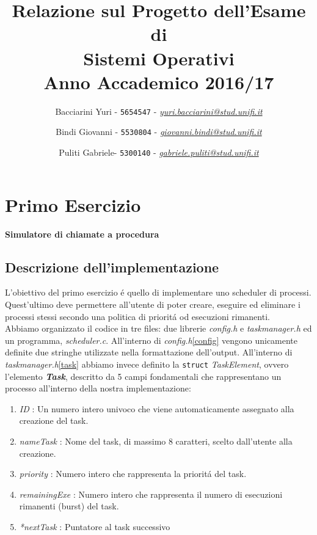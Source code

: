 \documentclass[a4paper]{article}
\begin{document}
 

\title{\vspace{2cm}Relazione sul Progetto dell'Esame di\\ \textbf{Sistemi Operativi}\\ Anno Accademico 2016/17}

\author{Bacciarini Yuri - \texttt{5654547} - \href{mailto:yuri.bacciarini@stud.unifi.it}{\textit{yuri.bacciarini@stud.unifi.it}}
   \and Bindi Giovanni - \texttt{5530804} - \href{mailto:giovanni.bindi@stud.unifi.it}{\textit{giovanni.bindi@stud.unifi.it}}
   \and Puliti Gabriele- \texttt{5300140} - \href{mailto:gabriele.puliti@stud.unifi.it}{\textit{gabriele.puliti@stud.unifi.it}}} 



\maketitle

\newpage
\tableofcontents

\section{Primo Esercizio}
\textbf{Simulatore di chiamate a procedura}
\subsection{Descrizione dell'implementazione}
L'obiettivo del primo esercizio \'e quello di implementare uno scheduler di processi. Quest'ultimo deve permettere all'utente di poter creare, eseguire ed eliminare i processi stessi secondo una politica di priorit\'a od esecuzioni rimanenti. \\
Abbiamo organizzato il codice in tre files: due librerie \textit{config.h} e \textit{taskmanager.h} ed un programma, \textit{scheduler.c}. All'interno di \textit{config.h}\ref{config} vengono unicamente definite due stringhe utilizzate nella formattazione dell'output. All'interno di \textit{taskmanager.h}\ref{task} abbiamo invece definito la \texttt{struct} \textit{TaskElement}, ovvero l'elemento \textbf{\textit{Task}}, descritto da 5 campi fondamentali che rappresentano un processo all'interno della nostra implementazione:

\begin{enumerate}
\item \textit{ID} : Un numero intero univoco che viene automaticamente assegnato alla creazione del task.
\item \textit{nameTask} : Nome del task, di massimo 8 caratteri, scelto dall'utente alla creazione.
\item \textit{priority} : Numero intero che rappresenta la priorit\'a del task.
\item \textit{remainingExe} : Numero intero che rappresenta il numero di esecuzioni rimanenti (burst) del task.
\item \textit{*nextTask} : Puntatore al task successivo
\end{enumerate}
\end{document}
